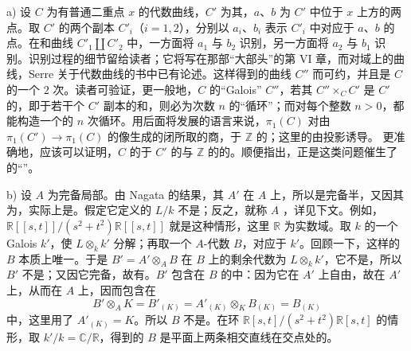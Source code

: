 a) 设 $C$ 为有普通二重点 $x$ 的代数曲线，$C'$ 为其，$a$、$b$ 为 $C'$ 中位于 $x$ 上方的两点。取 $C'$ 的两个副本 $C'_i$（$i=1,2$），分别以 $a_i$、$b_i$ 表示 $C'_i$ 中对应于 $a$、$b$ 的点。在和曲线 $C'_1\amalg C'_2$ 中，一方面将 $a_1$ 与 $b_2$ 识别，另一方面将 $a_2$ 与 $b_1$ 识别。识别过程的细节留给读者；它将写在那部“大部头”的第 VI 章，而对域上的曲线，Serre 关于代数曲线的书中已有论述。这样得到的曲线 $C''$ 而可约，并且是 $C$ 的一个 $2$ 次。读者可验证，更一般地，$C$ 的“Galois” $C''$，若其 $C''\times_C C'$ 是 $C'$ 的，即于若干个 $C'$ 副本的和，则必为次数 $n$ 的“循环”；而对每个整数 $n>0$，都能构造一个的 $n$ 次循环。用后面将发展的语言来说，$\pi_1(C)$ 对由 $\pi_1(C')\to\pi_1(C)$ 的像生成的闭所取的商，于 $\mathbb Z$ 的；这里的由投影诱导。
更准确地，应该可以证明，$C$ 的于 $C'$ 的与 $\mathbb Z$ 的的。顺便指出，正是这类问题催生了的“”。

b) 设 $A$ 为完备局部。由 Nagata 的结果，其 $A'$ 在 $A$ 上，所以是完备半，又因其为，实际上是。假定它定义的 $L/k$ 不是；反之，就称 $A$ ，详见下文。例如，$\mathbb R[[s,t]]/(s^2+t^2)\mathbb R[[s,t]]$ 就是这种情形，这里 $\mathbb R$ 为实数域。取 $k$ 的一个 Galois  $k'$，使 $L\otimes_k k'$ 分解；再取一个 $A$-代数 $B$，对应于 $k'$。回顾一下，这样的 $B$ 本质上唯一。于是 $B'=A'\otimes_A B$ 在 $B$ 上的剩余代数为 $L\otimes_k k'$，它不是，所以 $B'$ 不是；又因它完备，故有。$B'$ 包含在 $B$ 的中：因为它在 $A'$ 上自由，故在 $A'$ 上，从而在 $A$ 上，因而包含在
\[
 B'\otimes_A K=B'_{(K)}=A'_{(K)}\otimes_K B_{(K)}=B_{(K)}
\]
中，这里用了 $A'_{(K)}=K$。所以 $B$ 不是。在环 $\mathbb R[s,t]/(s^2+t^2)\mathbb R[s,t]$ 的情形，取 $k'/k=\mathbb C/\mathbb R$，得到的 $B$ 是平面上两条相交直线在交点处的。

